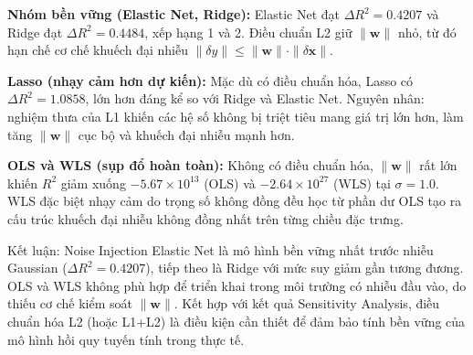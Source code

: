 \begin{table}[h]
\centering
\caption{$R^2$ tại mức cơ sở ($\sigma=0$) và mức nhiễu cao nhất ($\sigma=1.0$), cùng độ giảm $\Delta R^2$.
Ô đánh dấu ($\dagger$) biểu thị kết quả bất thường do mô hình sụp đổ.}
\label{tab:noise_injection}
\end{table}

\textbf{Nhóm bền vững (Elastic Net, Ridge):}
Elastic Net đạt $\Delta R^2 = 0.4207$ và Ridge đạt $\Delta R^2 = 0.4484$, xếp hạng 1 và 2.
Điều chuẩn L2 giữ $\|\mathbf{w}\|$ nhỏ, từ đó hạn chế cơ chế khuếch đại nhiễu
$\|\delta\hat{y}\| \leq \|\mathbf{w}\| \cdot \|\delta\mathbf{x}\|$.

\textbf{Lasso (nhạy cảm hơn dự kiến):}
Mặc dù có điều chuẩn hóa, Lasso có $\Delta R^2 = 1.0858$, lớn hơn đáng kể so với Ridge và Elastic Net.
Nguyên nhân: nghiệm thưa của L1 khiến các hệ số không bị triệt tiêu mang giá trị lớn hơn,
làm tăng $\|\mathbf{w}\|$ cục bộ và khuếch đại nhiễu mạnh hơn.

\textbf{OLS và WLS (sụp đổ hoàn toàn):}
Không có điều chuẩn hóa, $\|\mathbf{w}\|$ rất lớn khiến $R^2$ giảm xuống $-5.67\times10^{13}$ (OLS)
và $-2.64\times10^{27}$ (WLS) tại $\sigma=1.0$.
WLS đặc biệt nhạy cảm do trọng số không đồng đều học từ phần dư OLS
tạo ra cấu trúc khuếch đại nhiễu không đồng nhất trên từng chiều đặc trưng.

\begin{importantbox}{Kết luận: Noise Injection}
Elastic Net là mô hình bền vững nhất trước nhiễu Gaussian ($\Delta R^2 = 0.4207$),
tiếp theo là Ridge với mức suy giảm gần tương đương.
OLS và WLS không phù hợp để triển khai trong môi trường có nhiễu đầu vào,
do thiếu cơ chế kiểm soát $\|\mathbf{w}\|$.
Kết hợp với kết quả Sensitivity Analysis, điều chuẩn hóa L2 (hoặc L1+L2) là điều kiện cần thiết
để đảm bảo tính bền vững của mô hình hồi quy tuyến tính trong thực tế.
\end{importantbox}

